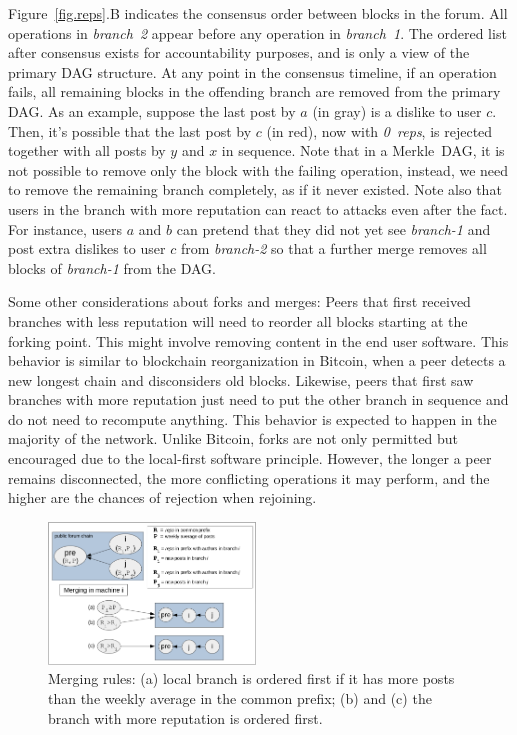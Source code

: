 \documentclass[10pt,journal,compsoc]{IEEEtran}
\newcommand{\nreps}[1] {\emph{#1~reps\xspace}}
\begin{document}
Figure~\ref{fig.reps}.B indicates the consensus order between blocks in the
forum.
All operations in \emph{branch~2} appear before any operation in
\emph{branch~1}.
The ordered list after consensus exists for accountability purposes, and is
only a view of the primary DAG structure.
At any point in the consensus timeline, if an operation fails, all remaining
blocks in the offending branch are removed from the primary DAG.
As an example, suppose the last post by $a$ (in gray) is a dislike to user $c$.
Then, it's possible that the last post by $c$ (in red), now with \nreps{0}, is
rejected together with all posts by $y$ and $x$ in sequence.
%
Note that in a Merkle~DAG, it is not possible to remove only the block with the
failing operation, instead, we need to remove the remaining branch completely,
as if it never existed.
%
Note also that users in the branch with more reputation can react to attacks
even after the fact.
For instance, users $a$ and $b$ can pretend that they did not yet see
\emph{branch-1} and post extra dislikes to user $c$ from \emph{branch-2} so
that a further merge removes all blocks of \emph{branch-1} from the DAG.

Some other considerations about forks and merges:
%
Peers that first received branches with less reputation will need to reorder
all blocks starting at the forking point.
This might involve removing content in the end user software.
This behavior is similar to blockchain reorganization in Bitcoin, when a peer
detects a new longest chain and disconsiders old blocks.
%
Likewise, peers that first saw branches with more reputation just need to put
the other branch in sequence and do not need to recompute anything.
This behavior is expected to happen in the majority of the network.
%
Unlike Bitcoin, forks are not only permitted but encouraged due to the
local-first software principle.
However, the longer a peer remains disconnected, the more conflicting
operations it may perform, and the higher are the chances of rejection when
rejoining.

\begin{figure}
\centering
\includegraphics[width=0.49\textwidth]{merge.png}
\caption{
    Merging rules:
    (a) local branch is ordered first if it has more posts than the weekly
        average in the common prefix;
    (b) and (c) the branch with more reputation is ordered first.
}
\label{fig.merge}
\end{figure}
\end{document}
